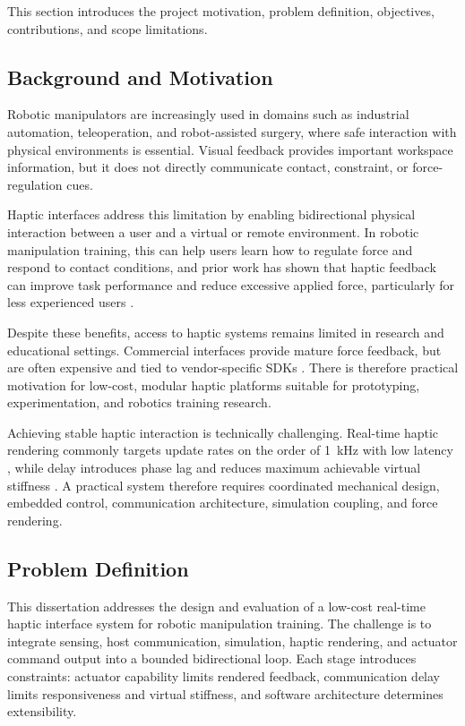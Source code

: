\noindent
This section introduces the project motivation, problem definition, objectives, contributions, and scope limitations.

\subsection{Background and Motivation} \label{sec:introduction_background}

Robotic manipulators are increasingly used in domains such as industrial automation, teleoperation, and robot-assisted surgery, where safe interaction with physical environments is essential. Visual feedback provides important workspace information, but it does not directly communicate contact, constraint, or force-regulation cues.

Haptic interfaces address this limitation by enabling bidirectional physical interaction between a user and a virtual or remote environment. In robotic manipulation training, this can help users learn how to regulate force and respond to contact conditions, and prior work has shown that haptic feedback can improve task performance and reduce excessive applied force, particularly for less experienced users \cite{giriApplicationBasedReviewHaptics2021,bergholzBenefitsHapticFeedback2023}.

Despite these benefits, access to haptic systems remains limited in research and educational settings. Commercial interfaces provide mature force feedback, but are often expensive and tied to vendor-specific SDKs \cite{giriApplicationBasedReviewHaptics2021}. There is therefore practical motivation for low-cost, modular haptic platforms suitable for prototyping, experimentation, and robotics training research.

Achieving stable haptic interaction is technically challenging. Real-time haptic rendering commonly targets update rates on the order of 1~kHz with low latency \cite{ruspiniHapticDisplayComplex1997}, while delay introduces phase lag and reduces maximum achievable virtual stiffness \cite{adamsStableHapticInteraction1999}. A practical system therefore requires coordinated mechanical design, embedded control, communication architecture, simulation coupling, and force rendering.

\subsection{Problem Definition}

This dissertation addresses the design and evaluation of a low-cost real-time haptic interface system for robotic manipulation training. The challenge is to integrate sensing, host communication, simulation, haptic rendering, and actuator command output into a bounded bidirectional loop. Each stage introduces constraints: actuator capability limits rendered feedback, communication delay limits responsiveness and virtual stiffness, and software architecture determines extensibility.

